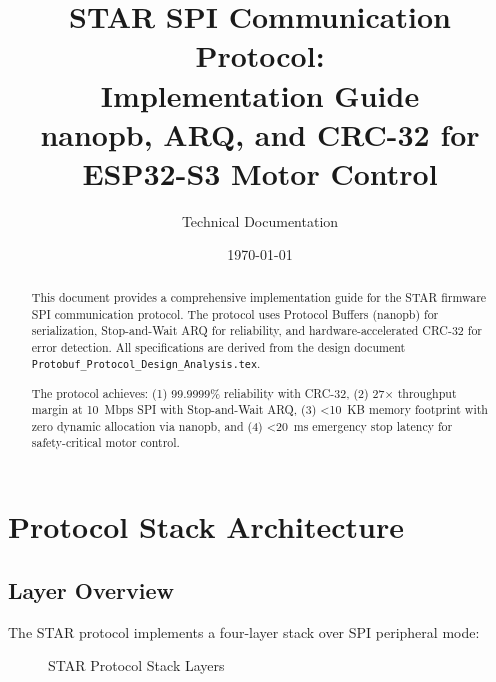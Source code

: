 \documentclass[12pt,letterpaper]{article}
\title{\textbf{STAR SPI Communication Protocol:\\Implementation Guide}\\[0.5em]\large{nanopb, ARQ, and CRC-32 for ESP32-S3 Motor Control}}
\author{Technical Documentation}
\date{\today}
\begin{document}
\maketitle

\begin{abstract}
This document provides a comprehensive implementation guide for the STAR firmware SPI communication protocol. The protocol uses Protocol Buffers (nanopb) for serialization, Stop-and-Wait ARQ for reliability, and hardware-accelerated CRC-32 for error detection. All specifications are derived from the design document \texttt{Protobuf\_Protocol\_Design\_Analysis.tex}.

The protocol achieves: (1) 99.9999\% reliability with CRC-32, (2) 27× throughput margin at 10~Mbps SPI with Stop-and-Wait ARQ, (3) <10~KB memory footprint with zero dynamic allocation via nanopb, and (4) <20~ms emergency stop latency for safety-critical motor control.
\end{abstract}

\tableofcontents
\newpage

\section{Protocol Stack Architecture}

\subsection{Layer Overview}

The STAR protocol implements a four-layer stack over SPI peripheral mode:

\begin{figure}[h]
\centering
{}
\caption{STAR Protocol Stack Layers}
\end{figure}
\end{document}
